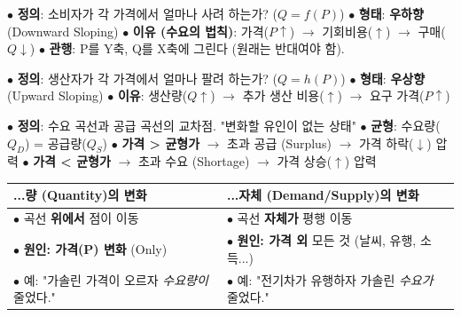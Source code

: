 \documentclass[11pt,a4paper]{book}
\theoremstyle{definition}
\begin{document}
\begin{tcolorbox}[title=\textbf{2. 수요 (Demand, $D_0$)}]
    $\bullet$ \textbf{정의}: 소비자가 각 가격에서 얼마나 사려 하는가? ($Q = f(P)$)
    \newline
    $\bullet$ \textbf{형태}: \textbf{우하향} (Downward Sloping)
    \newline
    $\bullet$ \textbf{이유 (수요의 법칙)}: 가격($P \uparrow$) $\rightarrow$ 기회비용($\uparrow$) $\rightarrow$ 구매($Q \downarrow$)
    \newline
    $\bullet$ \textbf{관행}: P를 Y축, Q를 X축에 그린다 (원래는 반대여야 함).
\end{tcolorbox}

\begin{tcolorbox}[title=\textbf{3. 공급 (Supply, $S_0$)}]
    $\bullet$ \textbf{정의}: 생산자가 각 가격에서 얼마나 팔려 하는가? ($Q = h(P)$)
    \newline
    $\bullet$ \textbf{형태}: \textbf{우상향} (Upward Sloping)
    \newline
    $\bullet$ \textbf{이유}: 생산량($Q \uparrow$) $\rightarrow$ 추가 생산 비용($\uparrow$) $\rightarrow$ 요구 가격($P \uparrow$)
\end{tcolorbox}

\begin{tcolorbox}[title=\textbf{4. 시장 균형 (Equilibrium, $E$)}]
    $\bullet$ \textbf{정의}: 수요 곡선과 공급 곡선의 교차점. "변화할 유인이 없는 상태"
    \newline
    $\bullet$ \textbf{균형}: 수요량($Q_D$) = 공급량($Q_S$)
    \newline
    $\bullet$ \textbf{가격 \textgreater{} 균형가} $\rightarrow$ 초과 공급 (Surplus) $\rightarrow$ 가격 하락($\downarrow$) 압력
    \newline
    $\bullet$ \textbf{가격 \textless{} 균형가} $\rightarrow$ 초과 수요 (Shortage) $\rightarrow$ 가격 상승($\uparrow$) 압력
\end{tcolorbox}

\begin{warningbox}[title={★ 모듈 1의 핵심: 용어 구분 ★}]
\begin{tabularx}{\linewidth}{>{\raggedright}X >{\raggedright}X}
    \textbf{...량 (Quantity)의 변화} & \textbf{...자체 (Demand/Supply)의 변화} \\
    \midrule
    $\bullet$ 곡선 \textbf{위에서} 점이 이동 & $\bullet$ 곡선 \textbf{자체가} 평행 이동 \\
    $\bullet$ \textbf{원인: 가격(P) 변화} (Only) & $\bullet$ \textbf{원인: 가격 외} 모든 것 (날씨, 유행, 소득...) \\
    $\bullet$ 예: "가솔린 가격이 오르자 \textit{수요량이} 줄었다." & $\bullet$ 예: "전기차가 유행하자 가솔린 \textit{수요가} 줄었다." \\
\end{tabularx}
\end{warningbox}
\end{document}
